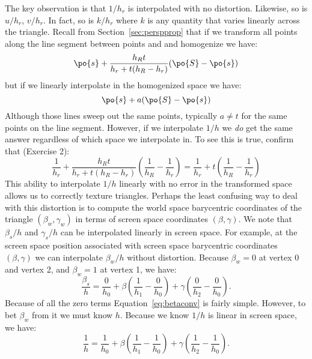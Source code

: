The key observation is that $1/h_r$ is interpolated with no
distortion.  Likewise, so is $u/h_r$, $v/h_r$.  In fact, so is $k/h_r$ where
$k$ is any quantity that varies linearly across the triangle.
Recall from Section~\ref{sec:perspprop} that if we transform all points along the line segment
between points  and  and homogenize we have:
\begin{displaymath}
\po{s} + \frac{h_Rt}{h_r + t(h_R - h_r)}(\po{S} - \po{s})
\end{displaymath}
but if we linearly interpolate in the homogenized space we have:
\begin{displaymath}
\po{s} + a(\po{S} - \po{s})
\end{displaymath}
Although those lines sweep out the same points, typically $a \neq t$
for the same points on the line segment.  However, if we interpolate
$1/h$ we \emph{do} get the same answer regardless of which space
we interpolate in.  To see this is true, confirm that (Exercise 2):
\begin{equation}\label{eq:hyperbolint}
\frac{1}{h_r} + \frac{h_Rt}{h_r + t(h_R - h_r)}
\left(\frac{1}{h_R} - \frac{1}{h_r}\right)
=\frac{1}{h_r} + t\left(\frac{1}{h_R} - \frac{1}{h_r}\right)
\end{equation}
This ability to interpolate $1/h$ linearly with no error in the 
transformed space allows us to correctly texture triangles.
Perhaps the least confusing way to deal with this distortion
is to compute the world space barycentric coordinates of
the triangle $(\beta_w,\gamma_w)$ in terms of screen space
coordinates $(\beta,\gamma)$.  We note that $\beta_s/h$ and
$\gamma_s/h$ can be interpolated linearly in screen space.
For example, at the screen space position associated with
screen space barycentric coordinates $(\beta,\gamma)$ we
can interpolate $\beta_w/h$ without distortion.  Because
$\beta_w=0$ at vertex 0 and vertex 2, and $\beta_w=1$ at
vertex 1, we have:
\begin{equation}\label{eq:betaconv}
\frac{\beta_s}{h} = \frac{0}{h_0} + 
                    \beta \left( \frac{1}{h_1} - \frac{0}{h_0}\right) + 
                    \gamma \left( \frac{0}{h_2} - \frac{0}{h_0}\right).
\end{equation}
Because of all the zero terms Equation~\ref{eq:betaconv} is
fairly simple.  However, to bet $\beta_w$ from it we must know $h$.
Because we know $1/h$ is linear in screen space, we have:
\begin{equation}\label{eq:hlin}
\frac{1}{h} = \frac{1}{h_0} + 
                    \beta \left( \frac{1}{h_1} - \frac{1}{h_0}\right) + 
                    \gamma \left( \frac{1}{h_2} - \frac{1}{h_0}\right).
\end{equation}
